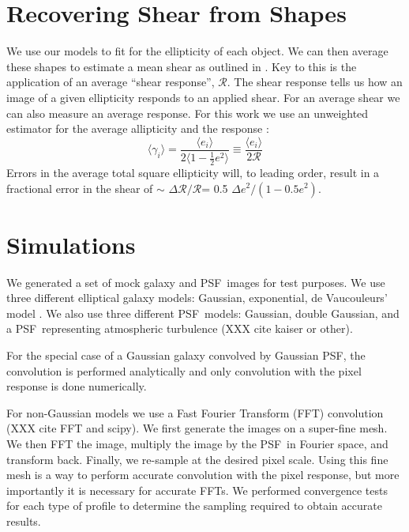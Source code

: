 \documentclass[12pt,preprint]{aastex}
\newcommand{\psf}{PSF}
\newcommand{\Rshear}{\ensuremath{\mathcal{R}}}
\newcommand{\rfracerr}{\ensuremath{\Delta \Rshear/\Rshear}}
\begin{document}
\section{Recovering Shear from Shapes}

We use our models to fit for the ellipticity of each object.  We can then
average these shapes to estimate a mean shear as outlined in \citet{bern02}.
Key to this is the application of an average ``shear response'', \Rshear.  The
shear response tells us how an image of a given ellipticity responds to an
applied shear.  For an average shear we can also measure an average response.
For this work we use an unweighted estimator for the average allipticity and
the response \citep[see e.g.  Equation 5.11,][]{bern02}:
\begin{equation} \label{eq:shearest}
\langle \gamma_i \rangle  = \frac{\langle e_i \rangle}{2 \langle 1 - \frac{1}{2} e^2 \rangle } \equiv
  \frac{\langle e_i \rangle}{2 \Rshear} 
\end{equation}
\noindent Errors in the average total square ellipticity will, to leading
order, result in a fractional error in the shear of $\sim$ \rfracerr = 
0.5 $\Delta e^2/(1-0.5 e^2)$.

\section{Simulations} \label{sec:sim}

We generated a set of mock galaxy and \psf\ images for test purposes.  We use
three different elliptical galaxy models: Gaussian, exponential, de
Vaucouleurs' model \citep{devauc1948}.  We also use three different \psf\ models:
Gaussian, double Gaussian, and a \psf\ representing atmospheric turbulence (XXX
cite kaiser or other).

For the special case of a Gaussian galaxy convolved by Gaussian \psf, the
convolution is performed analytically and only convolution with the pixel
response is done numerically.  

For non-Gaussian models we use a Fast Fourier Transform (FFT) convolution (XXX
cite FFT and scipy).  We first generate the images on a super-fine mesh. We
then FFT the image, multiply the image by the \psf\ in Fourier space, and
transform back. Finally, we re-sample at the desired pixel scale.  Using this
fine mesh is a way to perform accurate convolution with the pixel response, but
more importantly it is necessary for accurate FFTs.  We performed convergence
tests for each type of profile to determine the sampling required to obtain
accurate results.
\end{document}
